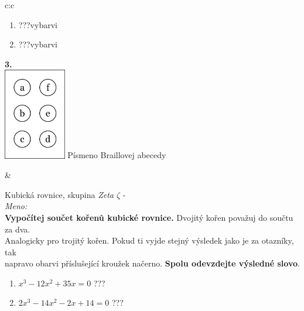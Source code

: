 \documentclass[10pt]{report}
\begin{document}
\begin{tabular}{c:c}
\begin{minipage}[c][99mm][t]{0.49\linewidth}
\begin{center}
\begin{minipage}{0.77\linewidth}
\begin{center}
\begin{varwidth}{\textwidth}
\begin{enumerate}
\item \quad \dotfill\; ???\;\dotfill \quad vybarvi
\item \quad \dotfill\; ???\;\dotfill \quad vybarvi
\end{enumerate}
\end{varwidth}
\end{center}
\end{minipage}
\begin{minipage}{0.20\linewidth}
\begin{center}
{\Huge\bfseries 3.} \\[2mm]
\includegraphics[height=40mm]{../images/braille.png}
{\small Písmeno Braillovej abecedy}
\end{center}
\end{minipage}
\end{center}
\end{minipage}
&
\begin{minipage}[c][99mm][t]{0.49\linewidth}
\begin{center}
\vspace{7mm}
{\huge Kubická rovnice, skupina \textit{Zeta $\zeta$} -}\\[4.5mm]
\textit{Meno:}\phantom{xxxxxxxxxxxxxxxxxxxxxxxxxxxxxxxxxxxxxxxxxxxxxxxxxxxxxxxxxxxxxxxxx}\\[3.5mm]
\textbf{Vypočítej součet kořenů kubické rovnice.} Dvojitý kořen považuj do součtu za dva.\\Analogicky pro trojitý kořen. Pokud ti vyjde stejný výsledek jako je za otazníky, tak\\napravo obarvi příslušející kroužek načerno. \textbf{Spolu odevzdejte výsledné slovo}.\\[3mm]
\begin{minipage}{0.77\linewidth}
\begin{center}
\begin{varwidth}{\textwidth}
\begin{enumerate}
\large
\item $x^3-12x^2+35x=0$\quad \dotfill\; ???\;\dotfill {}
\item $2x^3-14x^2-2x+14=0$\quad \dotfill\; ???\;\dotfill {}

\end{enumerate}
\end{varwidth}
\end{center}
\end{minipage}
\end{center}
\end{minipage}
\end{tabular}
\end{document}
